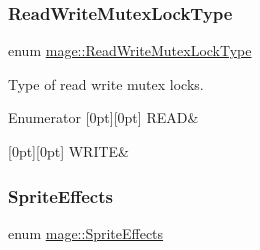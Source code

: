 \subsubsection{\texorpdfstring{Read\+Write\+Mutex\+Lock\+Type}{ReadWriteMutexLockType}}
{\footnotesize\ttfamily enum \hyperlink{namespacemage_afd76fcca37ce5c5b2227671290973c74}{mage\+::\+Read\+Write\+Mutex\+Lock\+Type}}

Type of read write mutex locks. \begin{DoxyEnumFields}{Enumerator}
[0pt][0pt]{}\hypertarget{namespacemage_afd76fcca37ce5c5b2227671290973c74a384918b13691984406aeb754f1c454d0}{}\label{namespacemage_afd76fcca37ce5c5b2227671290973c74a384918b13691984406aeb754f1c454d0} 
R\+E\+AD&\\
\hline

[0pt][0pt]{}\hypertarget{namespacemage_afd76fcca37ce5c5b2227671290973c74aff9d196f4bda4079f3f1ce90bd644662}{}\label{namespacemage_afd76fcca37ce5c5b2227671290973c74aff9d196f4bda4079f3f1ce90bd644662} 
W\+R\+I\+TE&\\
\hline

\end{DoxyEnumFields}
\hypertarget{namespacemage_a06ff9ac76b1e0636cc8949c3f0d4ac46}{}\label{namespacemage_a06ff9ac76b1e0636cc8949c3f0d4ac46} 
\subsubsection{\texorpdfstring{Sprite\+Effects}{SpriteEffects}}
{\footnotesize\ttfamily enum \hyperlink{namespacemage_a06ff9ac76b1e0636cc8949c3f0d4ac46}{mage\+::\+Sprite\+Effects}}

